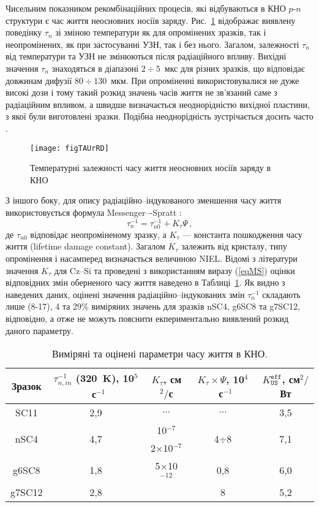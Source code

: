 Чисельним показником рекомбінаційних процесів, які відбуваються в КНО $p$-$n$ структури є
час життя неосновних носіїв заряду.
Рис.~\ref{figTAUrRD} відображає виявлену поведінку $\tau_n$ зі зміною температури як для опромінених зразків,
так і неопромінених, як при застосуванні УЗН, так і без нього.
Загалом, залежності $\tau_n$ від температури та УЗН не змінюються після радіаційного впливу.
Вихідні значення $\tau_n$ знаходяться в діапазоні $2\div5$~мкс для різних зразків,
що відповідає довжинам дифузії $80\div130$~мкм.
При опроміненні використовувалися не дуже високі дози і тому
такий розкид значень часів життя не зв'язаний саме з радіаційним впливом,
а швидше визначається неоднорідністю вихідної пластини, з якої були виготовлені зразки.
Подібна неоднорідність зустрічається досить часто \cite{Oxide:Chen,Oxide_Schon}.


\begin{figure}
\center
\texttt{[image: figTAUrRD]}
\caption{\label{figTAUrRD}
Температурні залежності часу життя неосновних носіїв заряду в КНО
\FigCaptionSSCRD
}%
\end{figure}

З іншого боку, для опису радіаційно--індукованого зменшення часу життя використовується формула Messenger–-Spratt \cite{Markvart}:
\begin{equation}
\label{eqMS}
\tau_n^{-1}=\tau_{n0}^{-1}+K_\tau\Psi\,,
\end{equation}
де
$\tau_{n0}$ відповідає неопроміненому зразку, а
$K_\tau$ --- константа пошкодження часу життя (lifetime damage constant).
Загалом $K_\tau$ залежить від кристалу, типу опромінення і насамперед визначається величиною NIEL.
Відомі з літератури значення $K_\tau$ для Cz--Si та проведені з використанням виразу (\ref{eqMS}) оцінки відповідних
змін оберненого часу життя наведено в Таблиці~\ref{tabTAUn}.
Як видно з наведених даних, оцінені значення радіаційно--індукованих змін $\tau_n^{-1}$ складають лише
(8-17), 4 та 29\% виміряних значень для зразків nSC4, g6SC8 та g7SC12, відповідно, а отже не можуть
пояснити екпериментально виявлений розкид даного параметру.

\begin{table}
\caption{\label{tabTAUn}Виміряні та оцінені параметри часу життя в КНО.
}
\center
\begin{tabular}{|c|c|c|c|c|}
\hline
Зразок &$\tau_{n,in}^{-1}$ (320~K), 10$^5$~с$^{-1}$&$K_\tau$, см$^2/$с&$K_\tau\times\Psi$, 10$^4$~с$^{-1}$&$K_\mathtt{US}^\mathtt{eff}$, см$^2/$Вт\\ \hline
SC11&2,9&$\ldots$&$\ldots$&3,5\\ \hline
\multirow{2}{*}{nSC4}&\multirow{2}{*}{4,7}&10$^{-7}$ \cite{NIEL:Jafari}&\multirow{2}{*}{4$\div$8}&\multirow{2}{*}{7,1}\\ %
&&2$\times$10$^{-7}$ \cite{n:Gaubas}&&\\ \hline
g6SC8&1,8&5$\times$10$^{-12}$&0,8&6,0\\ \cline{1-2} \cline{4-5}%
g7SC12&2,8& \cite{NIEL:Jafari,gamma:Kolkov} &8&5,2\\ \hline
\end{tabular}
\end{table}

